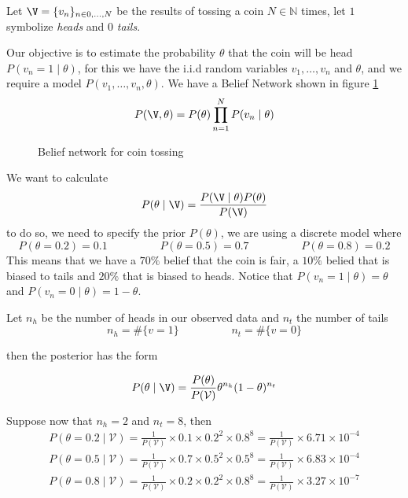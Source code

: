 \begin{exampleth}
  Let \(\V = \{v_n\}_{n \in 0,\dots,N}\) be the results of tossing a coin \(N \in
  \mathbb{N}\) times, let \(1\) symbolize \emph{heads} and \(0\) \emph{tails}.

  Our objective is to estimate the probability \(\theta\) that the coin will be
  head \(P(v_n = 1  \mid  \theta)\), for this we have the i.i.d random variables \(v_1,\dots,v_n\)
  and \(\theta\), and we require a model \(P(v_1,\dots,v_n,\theta)\). We have a
  Belief Network shown in figure \ref{fig:learning_coin}
  \[
    P(\V,\theta) = P(\theta)\prod_{n=1}^N P(v_n \mid \theta)
  \]

\begin{figure}[H]
\centering
{}
\caption{Belief network for coin tossing}
\label{fig:learning_coin}
\end{figure}

We want to calculate
\[
  P(\theta \mid \V) = \frac{P(\V \mid \theta)P(\theta)}{P(\V)}
\]
to do so, we need to specify the prior \(P(\theta)\), we are using a discrete
model where
\[
  P(\theta = 0.2) = 0.1 \hspace{2cm} P(\theta = 0.5) = 0.7 \hspace{2cm} P(\theta =
  0.8) = 0.2
\]
This means that we have a \(70\%\) belief that the coin is fair, a \(10\%\)
belied that is biased to tails and \(20\%\) that is biased to heads.
Notice that \(P(v_n = 1 \mid \theta) = \theta\) and \(P(v_n = 0 \mid \theta) = 1 - \theta\).

Let \(n_h\) be the number of heads in our observed data and \(n_t\)
the number of tails
\[
  n_{h} = \#\{v= 1\} \hspace{2cm} n_{t} = \#\{v = 0\}
\]

then the posterior has the form

\[
  P(\theta  \mid \V) = \frac{P(\theta)}{P(\mathcal{V})} \theta^{n_h}(1-\theta)^{n_t}
\]

Suppose now that \(n_h = 2\) and \(n_t = 8\), then
\begin{gather*}
  P(\theta = 0.2  \mid  \mathcal{V}) = \frac{1}{P(\mathcal{V})}\times 0.1 \times 0.2^{2}
  \times 0.8^{8} = \frac{1}{P(\mathcal{V})} \times 6.71\times10^{-4} \\
   P(\theta = 0.5  \mid  \mathcal{V}) = \frac{1}{P(\mathcal{V})}\times 0.7 \times 0.5^{2}
   \times 0.5^{8} = \frac{1}{P(\mathcal{V})} \times 6.83\times10^{-4}\\
    P(\theta = 0.8  \mid  \mathcal{V}) = \frac{1}{P(\mathcal{V})}\times 0.2 \times 0.2^{2}
  \times 0.8^{8} = \frac{1}{P(\mathcal{V})} \times 3.27\times10^{-7}
\end{gather*}


\end{exampleth}
